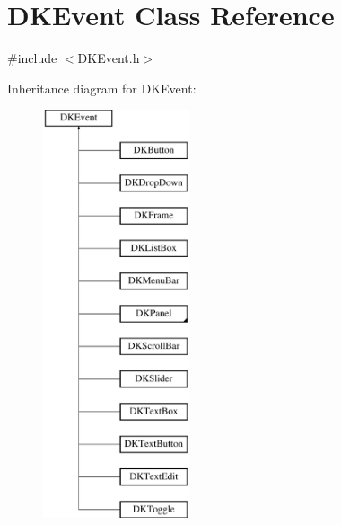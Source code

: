 \hypertarget{class_d_k_event}{\section{D\-K\-Event Class Reference}
\label{class_d_k_event}
}


{\ttfamily \#include $<$D\-K\-Event.\-h$>$}

Inheritance diagram for D\-K\-Event\-:\begin{figure}[H]
\begin{center}
\leavevmode
\includegraphics[height=12.000000cm]{class_d_k_event}
\end{center}
\end{figure}
